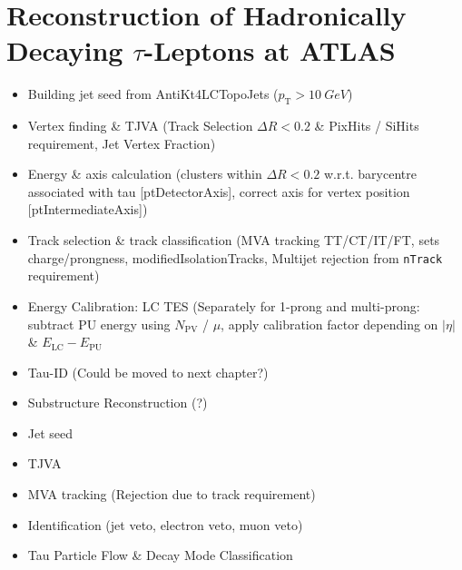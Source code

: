 \chapter{Reconstruction of Hadronically Decaying $\tau$-Leptons at ATLAS}
\label{sec:reconstruction}

\begin{itemize}
\item Building jet seed from AntiKt4LCTopoJets ($p_\mathrm{T} > \SI{10}{GeV}$)

\item Vertex finding \& TJVA (Track Selection $\Delta R < 0.2$ \& PixHits /
  SiHits requirement, Jet Vertex Fraction)

\item Energy \& axis calculation (clusters within $\Delta R < 0.2$ w.r.t.
  barycentre associated with tau [ptDetectorAxis], correct axis for vertex
  position [ptIntermediateAxis])

\item Track selection \& track classification (MVA tracking TT/CT/IT/FT, sets
  charge/prongness, modifiedIsolationTracks, Multijet rejection from
  \texttt{nTrack} requirement)

\item Energy Calibration: LC \textrightarrow TES (Separately for 1-prong and
  multi-prong: subtract PU energy using $N_\mathrm{PV}$ / $\mu$, apply
  calibration factor depending on $|\eta|$ \& $E_\mathrm{LC} - E_\mathrm{PU}$

\item Tau-ID (Could be moved to next chapter?)

\item Substructure Reconstruction (?)
\end{itemize}


\begin{itemize}
\item Jet seed
\item TJVA
\item MVA tracking (Rejection due to track requirement)
\item Identification (jet veto, electron veto, muon veto)
\item Tau Particle Flow \& Decay Mode Classification
\end{itemize}

\cite{atlas:taurec:run1}
\cite{atlas:taurec:run2}
\cite{atlas:taurec:decaymodes}


